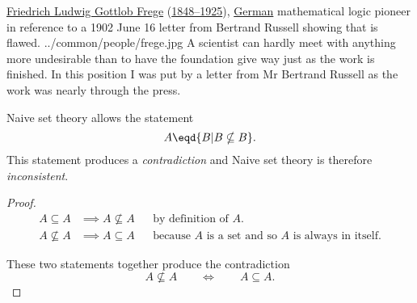 \qboxnps
  {
    \href{http://www-groups.dcs.st-and.ac.uk/~history/Biographies/Frege.html}{Friedrich Ludwig Gottlob Frege} 
    (\href{http://www-history.mcs.st-andrews.ac.uk/Timelines/TimelineF.html}{1848--1925}), 
    \href{http://www-history.mcs.st-andrews.ac.uk/BirthplaceMaps/Places/Germany.html}{German}
    mathematical logic pioneer  \\
    in reference to a 1902 June 16 letter from Bertrand Russell showing that 
     is flawed.
    \footnotemark
  }
  {../common/people/frege.jpg}
  {A scientist can hardly meet with anything more undesirable than to
    have the foundation give way just as the work is finished.
    In this position I was put by a letter from Mr Bertrand Russell
    as the work was nearly through the press.}


\begin{theorem}
\label{thm:russell}
Naive set theory allows the statement
\[ A \eqd \{ B|B\nsubseteq B\}.\]
This statement produces a \emph{contradiction}
and Naive set theory is therefore \emph{inconsistent}.
\end{theorem}
\begin{proof}
\begin{align*}
   A \subseteq    A &\implies A \nsubseteq A   && \text{by definition of $A$}. \\
   A \nsubseteq A &\implies A \subseteq    A   && \text{because $A$ is a set and so $A$ is always in itself}.
\end{align*}

These two statements together produce the contradiction
   \[A \nsubseteq A \qquad\iff\qquad A \subseteq   A.\]
\end{proof}

